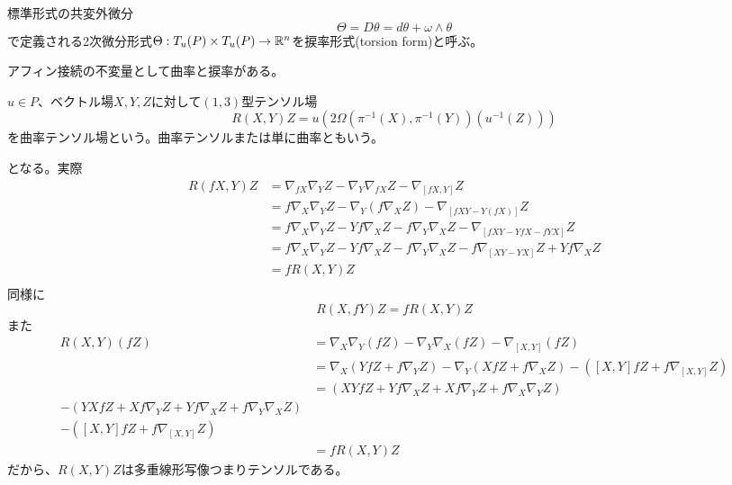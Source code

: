 	\begin{dfn}[捩率形式]
		標準形式の共変外微分
			\[\Theta = D\theta = d\theta + \omega \wedge \theta\]
		で定義される2次微分形式$\Theta: T_u(P) \times T_u(P) \rightarrow \mathbb{R}^n$を捩率形式(torsion form)と呼ぶ。
	\end{dfn}

	アフィン接続の不変量として曲率と捩率がある。
	\begin{dfn}[曲率テンソル]
		$u \in P$、ベクトル場$X, Y, Z$に対して$(1, 3)$型テンソル場
			\[R(X, Y)Z = u(2\Omega(\pi^{-1}(X), \pi^{-1}(Y))(u^{-1}(Z)))\]
		を曲率テンソル場という。曲率テンソルまたは単に曲率ともいう。
	\end{dfn}
	となる。実際
	\begin{align*}
		R(fX, Y)Z
		&= \nabla_{fX}\nabla_YZ - \nabla_Y\nabla_{fX}Z - \nabla_[fX, Y]Z\\
		&= f\nabla_X\nabla_YZ - \nabla_Y(f\nabla_XZ) - \nabla_[fXY - Y(fX)]Z\\
		&= f\nabla_X\nabla_YZ - Yf\nabla_XZ - f\nabla_Y\nabla_XZ - \nabla_[fXY - YfX - fYX]Z\\
		&= f\nabla_X\nabla_YZ - Yf\nabla_XZ - f\nabla_Y\nabla_XZ - f\nabla_[XY - YX]Z + Yf\nabla_XZ\\
		&= fR(X, Y)Z\\
	\end{align*}
	同様に
		\[R(X, fY)Z = fR(X, Y)Z\]
	また
	\begin{align*}
		R(X, Y)(fZ)
		&= \nabla_X\nabla_Y(fZ) - \nabla_Y\nabla_X(fZ) - \nabla_[X, Y](fZ)\\
		&= \nabla_X(YfZ + f\nabla_YZ) - \nabla_Y(XfZ + f\nabla_XZ) - ([X, Y]fZ + f\nabla_[X, Y]Z)\\
		&= (XYfZ + Yf\nabla_XZ + Xf\nabla_YZ + f\nabla_X\nabla_YZ)\\
		- (YXfZ + Xf\nabla_YZ + Yf\nabla_XZ + f\nabla_Y\nabla_XZ)\\
		- ([X, Y]fZ + f\nabla_[X, Y]Z)\\
		&= fR(X, Y)Z
	\end{align*}
	だから、$R(X, Y)Z$は多重線形写像つまりテンソルである。

